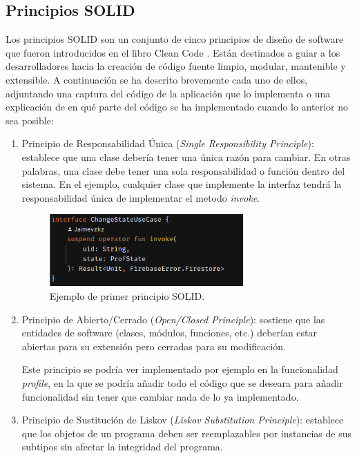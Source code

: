 \subsection{Principios SOLID}
\label{subsec:solid}
Los principios SOLID son un conjunto de cinco principios de diseño de software que fueron introducidos en el libro Clean Code \citep{CleanCode}. Están destinados a guiar a los desarrolladores hacia la creación de código fuente limpio, modular, mantenible y extensible. A continuación se ha descrito brevemente cada uno de ellos, adjuntando una captura del código de la aplicación que lo implementa o una explicación de en qué parte del código se ha implementado cuando lo anterior no sea posible:
\begin{enumerate}
    \item Principio de Responsabilidad Única (\textit{Single Responsibility Principle}): establece que una clase debería tener una única razón para cambiar. En otras palabras, una clase debe tener una sola responsabilidad o función dentro del sistema. En el ejemplo, cualquier clase que implemente la interfaz tendrá la responsabilidad única de implementar el metodo \textit{invoke}.
    \begin{figure}[h]
        \centering
        \includegraphics[width = 0.7\textwidth]{Imagenes/Fuentes/change_state.png}
        \caption{Ejemplo de primer principio SOLID.}
        \label{fig:change_state}
    \end{figure}
    \item Principio de Abierto/Cerrado (\textit{Open/Closed Principle}): sostiene que las entidades de software (clases, módulos, funciones, etc.) deberían estar abiertas para su extensión pero cerradas para su modificación.
    
    Este principio se podría ver implementado por ejemplo en la funcionalidad \textit{profile}, en la que se podría añadir todo el código que se deseara para añadir funcionalidad sin tener que cambiar nada de lo ya implementado.
    \item Principio de Sustitución de Liskov (\textit{Liskov Substitution Principle}): establece que los objetos de un programa deben ser reemplazables por instancias de sus subtipos sin afectar la integridad del programa.
    

\end{enumerate}
